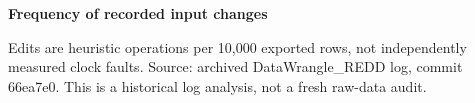 \documentclass[border=7mm]{standalone}
\begin{document}
\begin{minipage}{6.6in}
\centering
{\large\bfseries Frequency of recorded input changes\par}
\vspace{5mm}

\vspace{2mm}
{\small\raggedright Edits are heuristic operations per 10,000 exported rows, not independently measured clock faults. Source: archived DataWrangle\_REDD log, commit 66ea7e0. This is a historical log analysis, not a fresh raw-data audit.\par}
\end{minipage}
\end{document}
